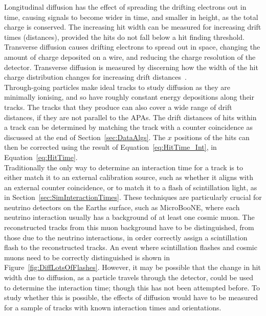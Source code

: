Longitudinal diffusion has the effect of spreading the drifting electrons out in time, causing signals to become wider in time, and smaller in height, as the total charge is conserved. The increasing hit width can be measured for increasing drift times (distances), provided the hits do not fall below a hit finding threshold. Transverse diffusion causes drifting electrons to spread out in space, changing the amount of charge deposited on a wire, and reducing the charge resolution of the detector. Transverse diffusion is measured by discerning how the width of the hit charge distribution changes for increasing drift distances~\citep{Li:2015rqa}. \\

Through-going particles make ideal tracks to study diffusion as they are minimally ionising, and so have roughly constant energy depositions along their tracks. The tracks that they produce can also cover a wide range of drift distances, if they are not parallel to the APAs. The drift distances of hits within a track can be determined by matching the track with a counter coincidence as discussed at the end of Section~\ref{sec:DataAlgs}. The $x$ positions of the hits can then be corrected using the result of Equation~\ref{eq:HitTime_Int}, in Equation~\ref{eq:HitTime}. \\

Traditionally the only way to determine an interaction time for a track is to either match it to an external calibration source, such as whether it aligns with an external counter coincidence, or to match it to a flash of scintillation light, as in Section~\ref{sec:SimInteractionTimes}. These techniques are particularly crucial for neutrino detectors on the Earths surface, such as MicroBooNE, where each neutrino interaction usually has a background of at least one cosmic muon. The reconstructed tracks from this muon background have to be distinguished, from those due to the neutrino interactions, in order correctly assign a scintillation flash to the reconstructed tracks. An event where scintillation flashes and cosmic muons need to be correctly distinguished is shown in Figure~\ref{fig:DiffLotsOfFlashes}. However, it may be possible that the change in hit width due to diffusion, as a particle travels through the detector, could be used to determine the interaction time; though this has not been attempted before. To study whether this is possible, the effects of diffusion would have to be measured for a sample of tracks with known interaction times and orientations. \\


